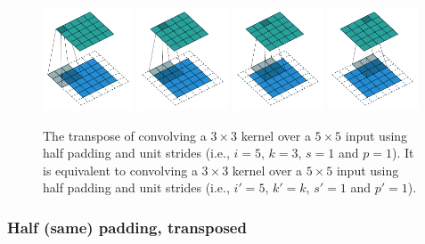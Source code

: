 \begin{figure}[p]
    \centering
    \includegraphics[width=0.24\textwidth]{pdf/same_padding_no_strides_transposed_00.pdf}
    \includegraphics[width=0.24\textwidth]{pdf/same_padding_no_strides_transposed_01.pdf}
    \includegraphics[width=0.24\textwidth]{pdf/same_padding_no_strides_transposed_02.pdf}
    \includegraphics[width=0.24\textwidth]{pdf/same_padding_no_strides_transposed_03.pdf}
    \caption{\label{fig:same_padding_no_strides_transposed} The transpose of
        convolving a $3 \times 3$ kernel over a $5 \times 5$ input using half
        padding and unit strides (i.e., $i = 5$, $k = 3$, $s = 1$ and $p = 1$).
        It is equivalent to convolving a $3 \times 3$ kernel over a $5 \times 5$
        input using half padding and unit strides (i.e., $i' = 5$, $k' = k$, $s'
        = 1$ and $p' = 1$).}
\end{figure}

\subsubsection{Half (same) padding, transposed}

